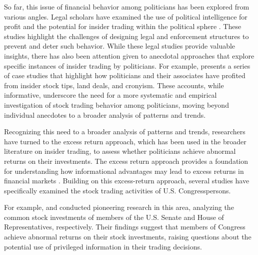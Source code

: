 \documentclass[15pt,letterpaper]{article}
\begin{document}
So far, this issue of financial behavior among politicians has been explored from various angles. Legal scholars have examined the use of political intelligence for profit and the potential for insider trading within the political sphere \citep{jerke2010,bainbridge2010}. These studies highlight the challenges of designing legal and enforcement structures to prevent and deter such behavior. 
While these legal studies provide valuable insights, there has also been attention given to anecdotal approaches that explore specific instances of insider trading by politicians. For example, \cite{schweizer2011} presents a series of case studies that highlight how politicians and their associates have profited from insider stock tips, land deals, and cronyism. These accounts, while informative, underscore the need for a more systematic and empirical investigation of stock trading behavior among politicians, moving beyond individual anecdotes to a broader analysis of patterns and trends.

Recognizing this need to a broader analysis of patterns and trends, researchers have turned to the excess return approach, which has been used in the broader literature on insider trading, to assess whether politicians achieve abnormal returns on their investments.
The excess return approach provides a foundation for understanding how informational advantages may lead to excess returns in financial markets \citep{jeng2003, ivkovic2005, seasholes2009}. 
Building on this excess-return approach, several studies have specifically examined the stock trading activities of U.S. Congresspersons. 

For example, \cite{zi24} and \cite{zi11} conducted pioneering research in this area, analyzing the common stock investments of members of the U.S. Senate and House of Representatives, respectively. Their findings suggest that members of Congress achieve abnormal returns on their stock investments, raising questions about the potential use of privileged information in their trading decisions.
\end{document}

